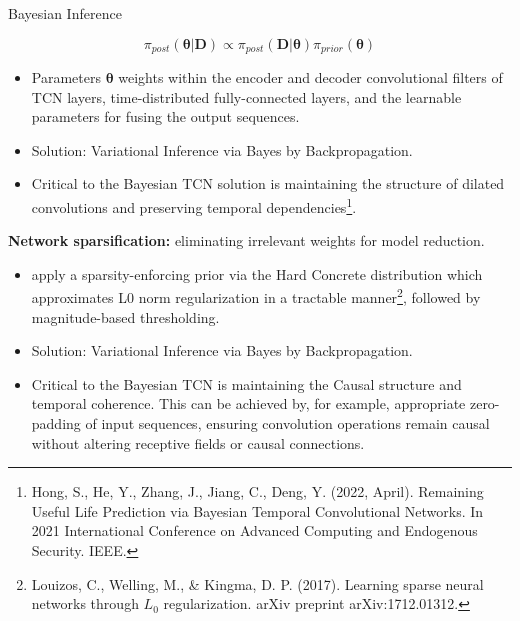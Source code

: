 \documentclass[8pt,xcolor=dvipsnames,compress]{beamer}
\begin{document}
\begin{frame}{Bayesian Inference}

\[
\pi_{post}(\boldsymbol{\theta}|\boldsymbol{D})
\propto
\pi_{post}(\boldsymbol{D} | \boldsymbol{\theta})
\pi_{prior}(\boldsymbol{\theta})
\]

\begin{itemize}
    \item Parameters $\boldsymbol{\theta}$ weights within the encoder and decoder convolutional filters of TCN layers, time-distributed fully-connected layers, and the learnable parameters for fusing the output sequences.
    \item Solution: Variational Inference via Bayes by Backpropagation.
    \item Critical to the Bayesian TCN solution is maintaining the structure of dilated convolutions and preserving temporal dependencies\footnote{Hong, S., He, Y., Zhang, J., Jiang, C., Deng, Y. (2022, April). Remaining Useful Life Prediction via Bayesian Temporal Convolutional Networks. In 2021 International Conference on Advanced Computing and Endogenous Security. IEEE.}. 
\end{itemize}

\textbf{Network sparsification:} eliminating irrelevant weights for model reduction.

\begin{itemize}
    \item apply a sparsity-enforcing prior via the Hard Concrete distribution which approximates L0 norm regularization in a tractable manner\footnote{Louizos, C., Welling, M., & Kingma, D. P. (2017). Learning sparse neural networks through $ L_0 $ regularization. arXiv preprint arXiv:1712.01312.}, followed by magnitude-based thresholding.
    \item Solution: Variational Inference via Bayes by Backpropagation.
    \item Critical to the Bayesian TCN is maintaining the Causal structure and temporal coherence. This can be achieved by, for example, appropriate zero-padding of input sequences, ensuring convolution operations remain causal without altering receptive fields or causal connections.
\end{itemize}


\end{frame}
\end{document}
